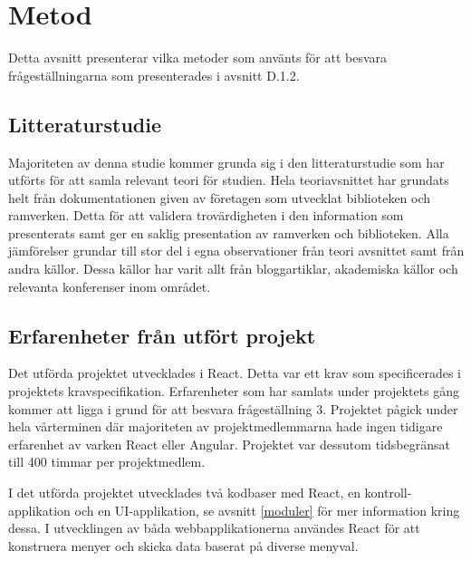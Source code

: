 \section{Metod}
\label{sec:axel-method}

Detta avsnitt presenterar vilka metoder som använts för att besvara frågeställningarna som presenterades i avsnitt D.1.2.

\subsection{Litteraturstudie}
Majoriteten av denna studie kommer grunda sig i den litteraturstudie som har utförts för att samla relevant teori för studien. Hela teoriavsnittet har grundats helt från dokumentationen given av företagen som utvecklat biblioteken och ramverken. Detta för att validera trovärdigheten i den information som presenterats samt ger en saklig presentation av ramverken och biblioteken. Alla jämförelser grundar till stor del i egna observationer från teori avsnittet samt från andra källor. Dessa källor har varit allt från bloggartiklar, akademiska källor och relevanta konferenser inom området.

\subsection{Erfarenheter från utfört projekt}
Det utförda projektet utvecklades i React. Detta var ett krav som specificerades i projektets kravspecifikation. Erfarenheter som har samlats under projektets gång kommer att ligga i grund för att besvara frågeställning 3. Projektet pågick under hela vårterminen där majoriteten av projektmedlemmarna hade ingen tidigare erfarenhet av varken React eller Angular. Projektet var dessutom tidsbegränsat till 400 timmar per projektmedlem. 

I det utförda projektet utvecklades två kodbaser med React, en kontroll-applikation och en UI-applikation, se avsnitt \ref{moduler} för mer information kring dessa. I utvecklingen av båda webbapplikationerna användes React för att konstruera menyer och skicka data baserat på diverse menyval.
